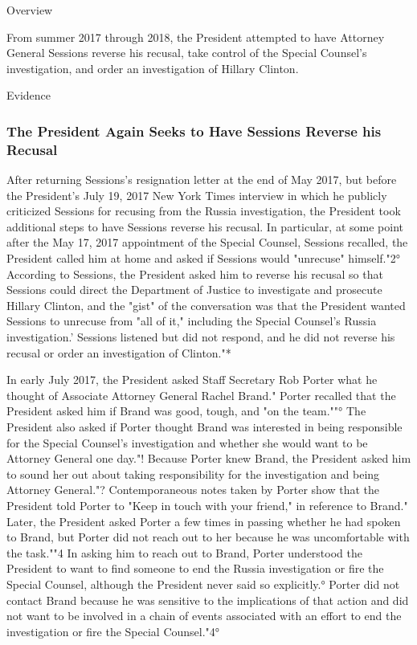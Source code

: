 Overview

From summer 2017 through 2018, the President attempted to have Attorney General Sessions reverse his recusal, take control of the Special Counsel's investigation, and order an investigation of Hillary Clinton.

Evidence

\subsubsection{The President Again Seeks to Have Sessions Reverse his Recusal}

After returning Sessions's resignation letter at the end of May 2017, but before the President's July 19, 2017 New York Times interview in which he publicly criticized Sessions for recusing from the Russia investigation, the President took additional steps to have Sessions reverse his recusal.
In particular, at some point after the May 17, 2017 appointment of the Special Counsel, Sessions recalled, the President called him at home and asked if Sessions would "unrecuse" himself."2°
According to Sessions, the President asked him to reverse his recusal so that Sessions could direct the Department of Justice to investigate and prosecute Hillary Clinton, and the "gist" of the conversation was that the President wanted Sessions to unrecuse from "all of it," including the Special Counsel's Russia investigation.'
Sessions listened but did not respond, and he did not reverse his recusal or order an investigation of Clinton."*

In early July 2017, the President asked Staff Secretary Rob Porter what he thought of Associate Attorney General Rachel Brand."
Porter recalled that the President asked him if Brand was good, tough, and "on the team.""°
The President also asked if Porter thought Brand was interested in being responsible for the Special Counsel's investigation and whether she would want to be Attorney General one day."!
Because Porter knew Brand, the President asked him to sound her out about taking responsibility for the investigation and being Attorney General."?
Contemporaneous notes taken by Porter show that the President told Porter to "Keep in touch with your friend," in reference to Brand."
Later, the President asked Porter a few times in passing whether he had spoken to Brand, but Porter did not reach out to her because he was uncomfortable with the task.""4
In asking him to reach out to Brand, Porter understood the President to want to find someone to end the Russia investigation or fire the Special Counsel, although the President never said so explicitly.°
Porter did not contact Brand because he was sensitive to the implications of that action and did not want to be involved in a chain of events associated with an effort to end the investigation or fire the Special Counsel."4°

